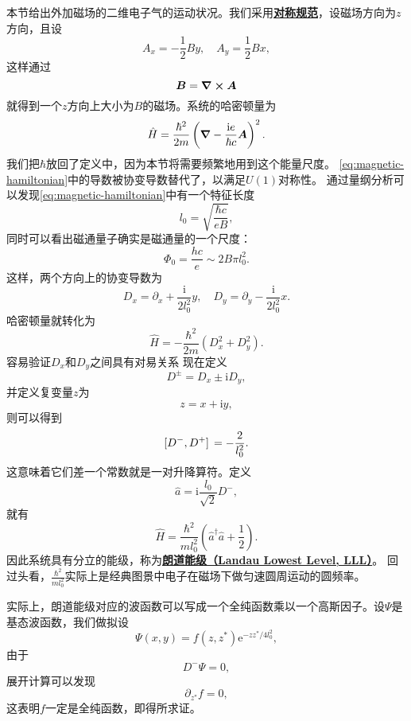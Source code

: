 \documentclass[hyperref, UTF8, a4paper]{ctexart}
\newcommand*{\ii}{\mathrm{i}}
\newcommand*{\ee}{\mathrm{e}}
\newcommand*{\concept}[1]{\underline{\textbf{#1}}}
\begin{document}
本节给出外加磁场的二维电子气的运动状况。我们采用\concept{对称规范}，设磁场方向为$z$方向，且设
\begin{equation}
    A_x = - \frac{1}{2} B y, \quad A_y = \frac{1}{2} B x,
\end{equation}
这样通过
\[
    \vb*{B} = \curl{\vb*{A}}
\]
就得到一个$z$方向上大小为$B$的磁场。系统的哈密顿量为
\begin{equation}
    \hat{H} = \frac{\hbar^2}{2m} \left( \grad - \frac{\ii e}{\hbar c} \vb*{A} \right)^2.
    \label{eq:magnetic-hamiltonian}
\end{equation}
我们把$\hbar$放回了定义中，因为本节将需要频繁地用到这个能量尺度。
\eqref{eq:magnetic-hamiltonian}中的导数被协变导数替代了，以满足$U(1)$对称性。
通过量纲分析可以发现\eqref{eq:magnetic-hamiltonian}中有一个特征长度
\begin{equation}
    l_0 = \sqrt{\frac{\hbar c}{e B}},
\end{equation}
同时可以看出磁通量子确实是磁通量的一个尺度：
\[
    \Phi_0 = \frac{h c}{e} \sim 2 B \pi l_0^2.
\]
这样，两个方向上的协变导数为
\begin{equation}
    D_x = \partial_x + \frac{\ii}{2l_0^2} y, \quad D_y = \partial_y - \frac{\ii}{2l_0^2}x.
\end{equation}
哈密顿量就转化为
\[
    \hat{H} = - \frac{\hbar^2}{2m} (D_x^2 + D_y^2).
\]
容易验证$D_x$和$D_y$之间具有对易关系
现在定义
\begin{equation}
    D^\pm = D_x \pm \ii D_y,
\end{equation}
并定义复变量$z$为
\begin{equation}
    z = x + \ii y,
\end{equation}
则可以得到
\begin{equation}
    \comm*{D^-}{D^+} = - \frac{2}{l_0^2}.
\end{equation}
这意味着它们差一个常数就是一对升降算符。定义
\begin{equation}
    \hat{a} = \ii \frac{l_0}{\sqrt{2}} D^-,
\end{equation}
就有
\begin{equation}
    \hat{H} = \frac{\hbar^2}{m l_0^2} \left(\hat{a}^\dagger \hat{a} + \frac{1}{2} \right).
\end{equation}
因此系统具有分立的能级，称为\concept{朗道能级（Landau Lowest Level, LLL）}。
回过头看，$\frac{\hbar^2}{m l_0^2}$实际上是经典图景中电子在磁场下做匀速圆周运动的圆频率。

实际上，朗道能级对应的波函数可以写成一个全纯函数乘以一个高斯因子。设$\Psi$是基态波函数，我们做拟设
\begin{equation}
    \Psi(x, y) = f(z, z^*) \ee^{- z z^* / 4l_0^2},
    \label{eq:landau-wave-packet}
\end{equation}
由于
\[
    D^- \Psi = 0,
\]
展开计算可以发现
\[
    \partial_{z^*} f = 0,
\]
这表明$f$一定是全纯函数，即得所求证。
\end{document}
